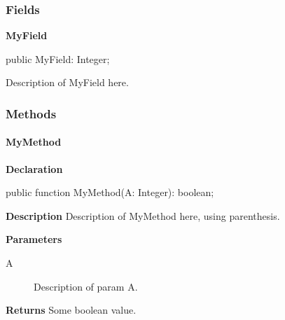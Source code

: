 \documentclass{report}
\newif\ifpdf
\begin{document}
\subsubsection*{\large{\textbf{Fields}}\normalsize\hspace{1ex}\hfill}
\begin{list}{}{
\setlength{\itemindent}{0cm}
\setlength{\listparindent}{0cm}
\setlength{\leftmargin}{\evensidemargin}
\addtolength{\leftmargin}{\tmplength}
\settowidth{\labelsep}{X}
\addtolength{\leftmargin}{\labelsep}
\setlength{\labelwidth}{\tmplength}
}
\label{ok_value_member_tags.TMyClass-MyField}
\item[\textbf{MyField}\hfill]
\ifpdf
\begin{flushleft}
\fi
\begin{ttfamily}
public MyField: Integer;\end{ttfamily}

\ifpdf
\end{flushleft}
\fi


\par Description of MyField here.\end{list}
\subsubsection*{\large{\textbf{Methods}}\normalsize\hspace{1ex}\hfill}
\paragraph*{MyMethod}\hspace*{\fill}

\label{ok_value_member_tags.TMyClass-MyMethod}
\begin{list}{}{
\setlength{\itemindent}{0cm}
\setlength{\listparindent}{0cm}
\setlength{\leftmargin}{\evensidemargin}
\addtolength{\leftmargin}{\tmplength}
\settowidth{\labelsep}{X}
\addtolength{\leftmargin}{\labelsep}
\setlength{\labelwidth}{\tmplength}
}
\item[\textbf{Declaration}\hfill]
\ifpdf
\begin{flushleft}
\fi
\begin{ttfamily}
public function MyMethod(A: Integer): boolean;\end{ttfamily}

\ifpdf
\end{flushleft}
\fi

\par
\item[\textbf{Description}]
Description of MyMethod here, using parenthesis.  \par
\item[\textbf{Parameters}]
\begin{description}
\item[A] Description of param A.
\end{description}
\item[\textbf{Returns}]Some boolean value.


\end{list}
\ifpdf
\end{document}
